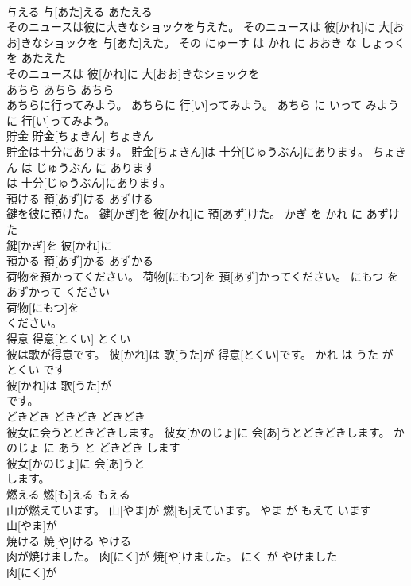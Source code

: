 \documentclass[8pt]{extreport}
\begin{document}
\begin{CJK}{UTF8}{min}
\\	与える	与[あた]える	あたえる	
\\	そのニュースは彼に大きなショックを与えた。	そのニュースは 彼[かれ]に 大[おお]きなショックを 与[あた]えた。	その にゅーす は かれ に おおき な しょっく を あたえた	
\\	そのニュースは 彼[かれ]に 大[おお]きなショックを
\\	あちら	あちら	あちら	
\\	あちらに行ってみよう。	あちらに 行[い]ってみよう。	あちら に いって みよう	
\\	に 行[い]ってみよう。			
\\	貯金	貯金[ちょきん]	ちょきん	
\\	貯金は十分にあります。	貯金[ちょきん]は 十分[じゅうぶん]にあります。	ちょきん は じゅうぶん に あります	
\\	は 十分[じゅうぶん]にあります。			
\\	預ける	預[あず]ける	あずける	
\\	鍵を彼に預けた。	鍵[かぎ]を 彼[かれ]に 預[あず]けた。	かぎ を かれ に あずけた	
\\	鍵[かぎ]を 彼[かれ]に
\\	預かる	預[あず]かる	あずかる	
\\	荷物を預かってください。	荷物[にもつ]を 預[あず]かってください。	にもつ を あずかって ください	
\\	荷物[にもつ]を
\\	ください。			
\\	得意	得意[とくい]	とくい	
\\	彼は歌が得意です。	彼[かれ]は 歌[うた]が 得意[とくい]です。	かれ は うた が とくい です	
\\	彼[かれ]は 歌[うた]が
\\	です。			
\\	どきどき	どきどき	どきどき	
\\	彼女に会うとどきどきします。	彼女[かのじょ]に 会[あ]うとどきどきします。	かのじょ に あう と どきどき します	
\\	彼女[かのじょ]に 会[あ]うと
\\	します。			
\\	燃える	燃[も]える	もえる	
\\	山が燃えています。	山[やま]が 燃[も]えています。	やま が もえて います	
\\	山[やま]が
\\	焼ける	焼[や]ける	やける	
\\	肉が焼けました。	肉[にく]が 焼[や]けました。	にく が やけました	
\\	肉[にく]が

\end{CJK}
\end{document}
